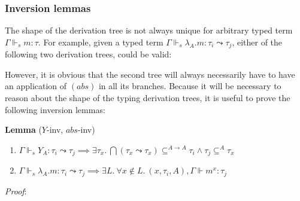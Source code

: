\documentclass[a4paperpaper,]{article}
\providecommand{\tightlist}{%
  \setlength{\itemsep}{0pt}\setlength{\parskip}{0pt}}
\newcommand{\concat}{\ensuremath{+\!\!\!\!+\,}}
\newcommand{\tocap}{\leadsto\kern-.5ex\cap}
\begin{document}
\subsubsection{Inversion lemmas}\label{inversion-lemmas}

The shape of the derivation tree is not always unique for arbitrary
typed term \(\Gamma \Vdash_s m :\tau\). For example, given a typed term
\(\Gamma \Vdash_s \lambda_A.m :\tau_i \leadsto \tau_j\), either of the
following two derivation trees, could be valid:


However, it is obvious that the second tree will always necessarily have
to have an application of \((abs)\) in all its branches. Because it will
be necessary to reason about the shape of the typing derivation trees,
it is useful to prove the following inversion lemmas:

\textbf{Lemma} (\(Y\)-inv, \(abs\)-inv)

\begin{enumerate}
\def\labelenumi{\roman{enumi})}
\tightlist
\item
  \(\Gamma \Vdash_s Y_{A} : \tau_i \leadsto \tau_j \implies \exists \tau_x.\ \bigcap (\tau_x \leadsto \tau_x) \subseteq^{A \to A} \tau_i \land \tau_j \subseteq^A \tau_x\)
\item
  \(\Gamma \Vdash_s \lambda_A.m : \tau_i \leadsto \tau_j \implies \exists L.\ \forall x \not\in L.\ (x, \tau_i, A),\Gamma \Vdash m^x : \tau_j\)
\end{enumerate}

\emph{Proof}:
\end{document}
